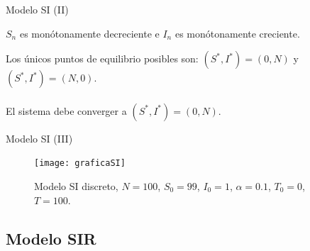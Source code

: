 \begin{frame}{Modelo SI (II)}
 
    

    \begin{lema}
        $S_n$ es monótonamente decreciente e $I_n$ es monótonamente creciente.
    \end{lema}

    \pause

    Los únicos puntos de equilibrio posibles son: $(S^*,I^*)=(0,N)$ y $(S^*,I^*)=(N,0)$.
    \\~\\
    El sistema debe converger a $(S^*,I^*)=(0,N)$.



\end{frame}

\begin{frame}{Modelo SI (III)}
    \begin{figure}
        \begin{center}
        \caption{Modelo SI discreto, $N=100$, $S_0=99$, $I_0 = 1$, $\alpha = 0.1$, $T_0 = 0$, $T = 100$.}
        \texttt{[image: graficaSI]}
        \end{center}
    \end{figure}
\end{frame}




\subsection{Modelo SIR}


